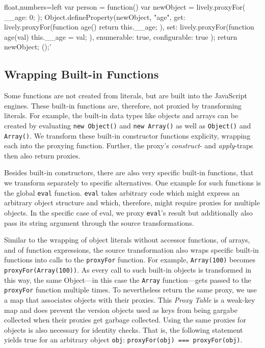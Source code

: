 \begin{code}{}{float,numbers=left}
var person = function() {
    var newObject = lively.proxyFor({
        __age: 0;
    });
    Object.defineProperty(newObject, "age", {
        get: lively.proxyFor(function age() {
            return this.__age;
        }),
        set: lively.proxyFor(function age(val) {
            this.__age = val;
        }),
        enumerable: true,
        configurable: true
    });
    return newObject;
}();'
\end{code}
\iffalse
\end{verbatim}\fi





\subsection{Wrapping Built-in Functions}

Some functions are not created from literals, but are built into the JavaScript engines.
These built-in functions are, therefore, not proxied by transforming literals.
For example, the built-in data types like objects and arrays can be created by evaluating \lstinline{new Object()} and \lstinline{new Array()} as well as \lstinline{Object()} and \lstinline{Array()}.
We transform these built-in constructor functions explicity, wrapping each into the proxying function.
Further, the proxy's \emph{construct}- and \emph{apply}-traps then also return proxies.

Besides built-in constructors, there are also very specific built-in functions, that we transform separately to specific alternatives.
One example for such functions is the global \lstinline{eval} function.
\lstinline{eval} takes arbitrary code which might express an arbitrary object structure and which, therefore, might require proxies for multiple objects.
In the specific case of eval, we proxy \lstinline{eval}'s result but additionally also pass its string argument through the source transformations.

Similar to the wrapping of object literals without accessor functions, of arrays, and of function expressions, the source transformation also wraps specific built-in functions into calls to the \lstinline{proxyFor} function.
For example, \lstinline{Array(100)} becomes \lstinline{proxyFor(Array(100))}.
As every call to such built-in objects is transformed in this way, the same Object---in this case the \lstinline{Array} function---gets passed to the \lstinline{proxyFor} function multiple times.
To nevertheless return the same proxy, we use a map that associates objects with their proxies.
This \emph{Proxy Table} is a weak-key map and does prevent the version objects used as keys from being gargabe collected when their proxies get garbage collected.
Using the same proxies for objects is also necessary for identity checks.
That is, the following statement yields true for an arbitrary object \lstinline{obj}: \lstinline{proxyFor(obj) === proxyFor(obj)}.


